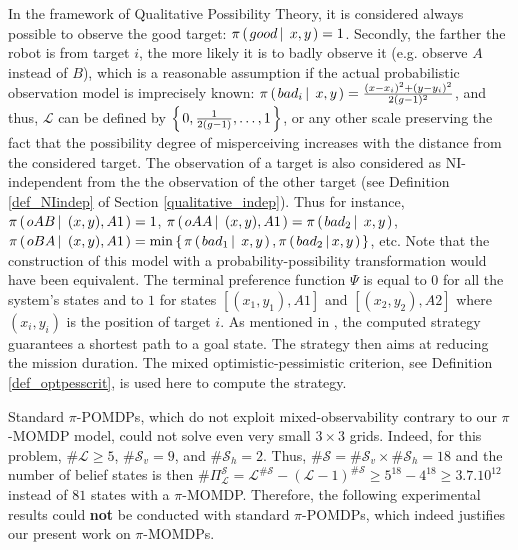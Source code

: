 In the framework of Qualitative Possibility Theory, 
it is considered always possible to observe the good target: 
$\pi \left( \left. good \, \right| \left. \, x,y \right. \right)=1$. 
Secondly, the farther the robot is from target $i$, 
the more likely it is to badly observe it 
(e.g. observe $A$ instead of $B$), 
which is a reasonable assumption 
if the actual probabilistic observation model is
imprecisely known: 
$\pi \left( \left.  bad_i \, \right| \left. \, x,y  \right. \right) 
= \frac{(x-x_i)^2 + (y-y_i)^2 }{2(g-1)^2}$,
and thus, $\mathcal{L}$
can be defined by $\left\{ \left.  0, \frac{1}{2(g-1)}, \ldots, 1 \right. \right\}$,
or any other scale preserving the fact
that the possibility degree of misperceiving 
increases with the distance from the considered target. 
The observation of a target is also considered 
as NI-independent from the the observation of the other target
(see Definition \ref{def_NIindep} of Section \ref{qualitative_indep}).
Thus for instance, 
$\pi \left( \left.  oAB \, \right| \left. \, (x,y), A1  \right. \right)=1$, 
$\pi \left( \left.  oAA \, \right| \left. \, (x,y), A1  \right. \right) 
= \pi \left( \left.  bad_2 \, \right| \left. \, x,y  \right. \right) $, 
$\pi \paren{ oBA \sachant (x,y), A1 } 
= \min \set{ \pi \paren{ bad_1 \sachant x,y },
\pi \paren{ bad_2 \sachant \hspace{-0.1cm} x,y }} $, etc.
Note that the construction of this model 
with a probability-possibility transformation 
\cite{Dubois93onpossibility/probability} 
would have been equivalent. 
The terminal preference function $\Psi$ is equal to $0$ 
for all the system's states
and to $1$ for states 
$[(x_{1},y_{1}),A1]$ and $[(x_{2},y_{2}),A2]$ 
where $(x_{i},y_{i})$ is the position of target $i$. 
As mentioned in \cite{Sabbadin:1999:pipomdp}, 
the computed strategy guarantees a shortest path to a goal state.
The strategy then aims at reducing the mission duration.
The mixed optimistic-pessimistic criterion,
see Definition \ref{def_optpesscrit},
is used here to compute the strategy.


Standard $\pi$-POMDPs, which do not exploit mixed-observability 
contrary to our $\pi$-MOMDP model, 
could not solve even very small $3 \times 3$ grids.
Indeed, for this problem, 
$\# \mathcal{L} \geqslant 5$, 
$\# \mathcal{S}_v = 9 $, 
and $\# \mathcal{S}_h = 2$. 
Thus, $\# \mathcal{S} = \# \mathcal{S}_v \times \# \mathcal{S}_h = 18$ 
and the number of belief states is then 
$\# \Pi^{\mathcal{S}}_{\mathcal{L}} 
= \mathcal{L}^{\# \mathcal{S}} - (\mathcal{L}-1)^{\# \mathcal{S}} 
\geqslant 5^{18} -4^{18} 
\geqslant 3.7.10^{12}$ 
instead of $81$ states with a $\pi$-MOMDP. 
Therefore, 
the following experimental results 
could \textbf{not} be conducted 
with standard $\pi$-POMDPs, 
which indeed justifies 
our present work on $\pi$-MOMDPs.

